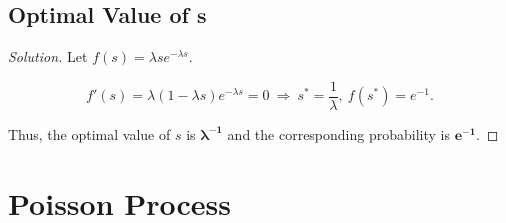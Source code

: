 \documentclass{article}
\newenvironment{solution}{\begin{proof}[\noindent\it Solution]}{\end{proof}}
\begin{document}
\vspace{0.5em}
\subsection{Optimal Value of $\boldsymbol{s}$}
\vspace{1em}
\begin{solution}
    Let $f(s)=\lambda se^{-\lambda s}$. 
    
    \vspace{-1em}
    $$f'(s)=\lambda\left(1-\lambda s\right)e^{-\lambda s}=0\ \Longrightarrow\ s^* = \frac{1}{\lambda},\ f(s^*)=e^{-1}.$$
    
    \hspace{2.6em}
    Thus, the optimal value of $s$ is \underline{$\boldsymbol{\lambda^{-1}}$} and the corresponding probability is \underline{$\boldsymbol{e^{-1}}$}.
\end{solution}

\newpage
\vspace{1em}
\section{Poisson Process}
\vspace{1em}
\end{document}
